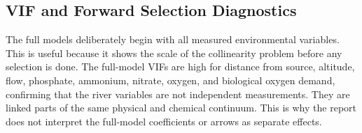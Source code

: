 \documentclass[11pt]{article}
\begin{document}
\subsection{VIF and Forward Selection Diagnostics}
The full models deliberately begin with all measured environmental variables. This is useful because it shows the scale of the collinearity problem before any selection is done. The full-model VIFs are high for distance from source, altitude, flow, phosphate, ammonium, nitrate, oxygen, and biological oxygen demand, confirming that the river variables are not independent measurements. They are linked parts of the same physical and chemical continuum. This is why the report does not interpret the full-model coefficients or arrows as separate effects.
\begin{table}[!h]
\centering
\caption{\label{tab:tab:full-vif}Variance inflation factors for the full constrained models before forward selection.}
\centering
{}
\end{table}
\end{document}
